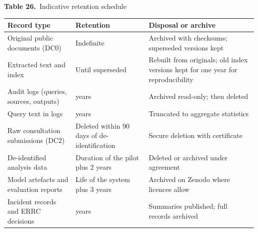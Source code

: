 \documentclass[border=10pt]{standalone}
\begin{document}
\begin{minipage}{17cm}
{\large\bfseries Table 26.}\ {\large Indicative retention schedule}\par\vspace{7pt}
\small
{}
\begin{tabularx}{\linewidth}{@{}>{\hsize=1.040\hsize\raggedright\arraybackslash}X>{\hsize=0.920\hsize\raggedright\arraybackslash}X>{\hsize=1.040\hsize\raggedright\arraybackslash}X@{}}
\arrayrulecolor{bapilrule}\toprule
\rowcolor{white}\textbf{Record type} & \textbf{Retention} & \textbf{Disposal or archive} \\
\midrule
Original public documents (DC0) & Indefinite & Archived with checksums; superseded versions kept \\
Extracted text and index & Until superseded & Rebuilt from originals; old index versions kept for one year for reproducibility \\
Audit logs (queries, sources, outputs) & 5 years & Archived read-only; then deleted \\
Query text in logs & 2 years & Truncated to aggregate statistics \\
Raw consultation submissions (DC2) & Deleted within 90 days of de-identification & Secure deletion with certificate \\
De-identified analysis data & Duration of the pilot plus 2 years & Deleted or archived under agreement \\
Model artefacts and evaluation reports & Life of the system plus 3 years & Archived on Zenodo where licences allow \\
Incident records and ERRC decisions & 7 years & Summaries published; full records archived \\
\bottomrule
\end{tabularx}
\par\vspace{5pt}{\footnotesize\itshape Subject to legal review against the Personal Data Protection Act, 2026, the National Data Management Act, 2026 and any rules issued under them.}
\par{}
\end{minipage}
\end{document}
